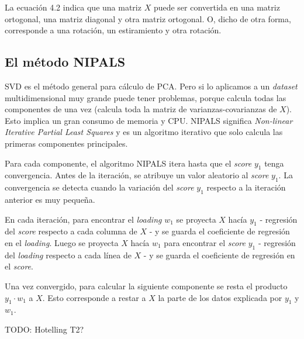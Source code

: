 \documentclass[11pt,spanish,listoffigures,listoftables]{tfgetsinf}
\begin{document}
    La ecuación 4.2 indica que una matriz \(X\) puede ser convertida en una matriz ortogonal, una matriz diagonal y otra matriz ortogonal. O, dicho de otra forma, corresponde a una rotación, un estiramiento y otra rotación.
    
    \subsection{El método NIPALS}
    SVD es el método general para cálculo de PCA. Pero si lo aplicamos a un {\em dataset} multidimensional muy grande puede tener problemas, porque calcula todas las componentes de una vez (calcula toda la matriz de varianzas-covarianzas de \(X\)). Esto implica un gran consumo de memoria y CPU. NIPALS significa {\em Non-linear Iterative Partial Least Squares} y es un algoritmo iterativo que solo calcula las primeras componentes principales.
    
    Para cada componente, el algoritmo NIPALS itera hasta que el {\em score} \(y_{1}\) tenga convergencia. Antes de la iteración, se atribuye un valor aleatorio al {\em score} \(y_{1}\). La convergencia se detecta cuando la variación del {\em score} \(y_{1}\) respecto a la iteración anterior es muy pequeña. 
    
     En cada iteración, para encontrar el {\em loading} \(w_{1}\) se proyecta \(X\) hacía \(y_{1}\) - regresión del {\em score} respecto a cada columna de \(X\) - y se guarda el coeficiente de regresión en el {\em loading}. Luego se proyecta \(X\) hacía \(w_{1}\) para encontrar el {\em score} \(y_{1}\) - regresión del {\em loading} respecto a cada línea de \(X\) - y se guarda el coeficiente de regresión en el {\em score}. 
    
    Una vez convergido, para calcular la siguiente componente se resta el producto \(y_{1} \cdot w_{1}\) a \(X\). Esto corresponde a restar a \(X\) la parte de los datos explicada por \(y_{1}\) y \(w_{1}\).
    
    TODO: Hotelling T2?
    
\end{document}
